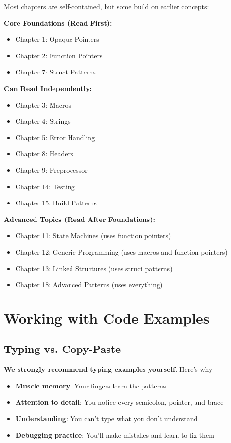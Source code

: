 \documentclass[10pt,openany]{book}
\begin{document}
Most chapters are self-contained, but some build on earlier concepts:

\textbf{Core Foundations (Read First):}
\begin{itemize}
    \item Chapter 1: Opaque Pointers
    \item Chapter 2: Function Pointers
    \item Chapter 7: Struct Patterns
\end{itemize}

\textbf{Can Read Independently:}
\begin{itemize}
    \item Chapter 3: Macros
    \item Chapter 4: Strings
    \item Chapter 5: Error Handling
    \item Chapter 8: Headers
    \item Chapter 9: Preprocessor
    \item Chapter 14: Testing
    \item Chapter 15: Build Patterns
\end{itemize}

\textbf{Advanced Topics (Read After Foundations):}
\begin{itemize}
    \item Chapter 11: State Machines (uses function pointers)
    \item Chapter 12: Generic Programming (uses macros and function pointers)
    \item Chapter 13: Linked Structures (uses struct patterns)
    \item Chapter 18: Advanced Patterns (uses everything)
\end{itemize}

\section*{Working with Code Examples}

\subsection*{Typing vs. Copy-Paste}

\textbf{We strongly recommend typing examples yourself.} Here's why:

\begin{itemize}
    \item \textbf{Muscle memory}: Your fingers learn the patterns
    \item \textbf{Attention to detail}: You notice every semicolon, pointer, and brace
    \item \textbf{Understanding}: You can't type what you don't understand
    \item \textbf{Debugging practice}: You'll make mistakes and learn to fix them
\end{itemize}
\end{document}
